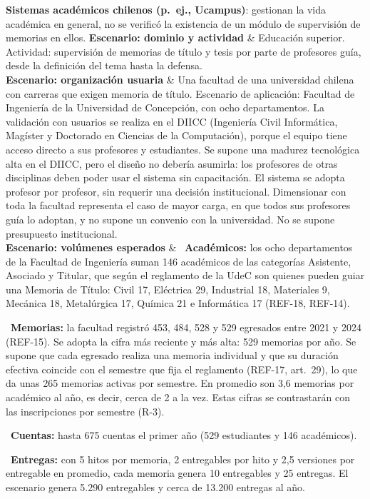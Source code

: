 \documentclass[10pt,a4paper]{article}
\newenvironment{kv}[1][4.6cm]
  {\footnotesize\setlength{\extrarowheight}{3pt}\xltabular{\linewidth}{|E{#1}|L|}\hline}
  {\endxltabular}
\newcommand{\kvrow}[2]{#1 & #2 \\ \hline}
\begin{document}
\begin{kv}[4.2cm]
{\textbf{Sistemas académicos chilenos (p.~ej., Ucampus)}: gestionan la vida académica en general, no se verificó la existencia de un módulo de supervisión de memorias en ellos.}
\kvrow{\textbf{Escenario: dominio y actividad}}{Educación superior. Actividad: supervisión de memorias de título y tesis por parte de profesores guía, desde la definición del tema hasta la defensa.}
\kvrow{\textbf{Escenario: organización usuaria}}{Una facultad de una universidad chilena con carreras que exigen memoria de título. Escenario de aplicación: Facultad de Ingeniería de la Universidad de Concepción, con ocho departamentos. La validación con usuarios se realiza en el DIICC (Ingeniería Civil Informática, Magíster y Doctorado en Ciencias de la Computación), porque el equipo tiene acceso directo a sus profesores y estudiantes. Se supone una madurez tecnológica alta en el DIICC, pero el diseño no debería asumirla: los profesores de otras disciplinas deben poder usar el sistema sin capacitación. El sistema se adopta profesor por profesor, sin requerir una decisión institucional. Dimensionar con toda la facultad representa el caso de mayor carga, en que todos sus profesores guía lo adoptan, y no supone un convenio con la universidad. No se supone presupuesto institucional.}
\kvrow{\textbf{Escenario: volúmenes esperados}}{%
\textbullet~\textbf{Académicos:} los ocho departamentos de la Facultad de Ingeniería suman 146 académicos de las categorías Asistente, Asociado y Titular, que según el reglamento de la UdeC son quienes pueden guiar una Memoria de Título: Civil 17, Eléctrica 29, Industrial 18, Materiales 9, Mecánica 18, Metalúrgica 17, Química 21 e Informática 17 (REF-18, REF-14).\par
\textbullet~\textbf{Memorias:} la facultad registró 453, 484, 528 y 529 egresados entre 2021 y 2024 (REF-15). Se adopta la cifra más reciente y más alta: 529 memorias por año. Se supone que cada egresado realiza una memoria individual y que su duración efectiva coincide con el semestre que fija el reglamento (REF-17, art.~29), lo que da unas 265 memorias activas por semestre. En promedio son 3,6 memorias por académico al año, es decir, cerca de 2 a la vez. Estas cifras se contrastarán con las inscripciones por semestre (R-3).\par
\textbullet~\textbf{Cuentas:} hasta 675 cuentas el primer año (529 estudiantes y 146 académicos).\par
\textbullet~\textbf{Entregas:} con 5 hitos por memoria, 2 entregables por hito y 2,5 versiones por entregable en promedio, cada memoria genera 10 entregables y 25 entregas. El escenario genera 5.290 entregables y cerca de 13.200 entregas al año.\par
}
\end{kv}
\end{document}
